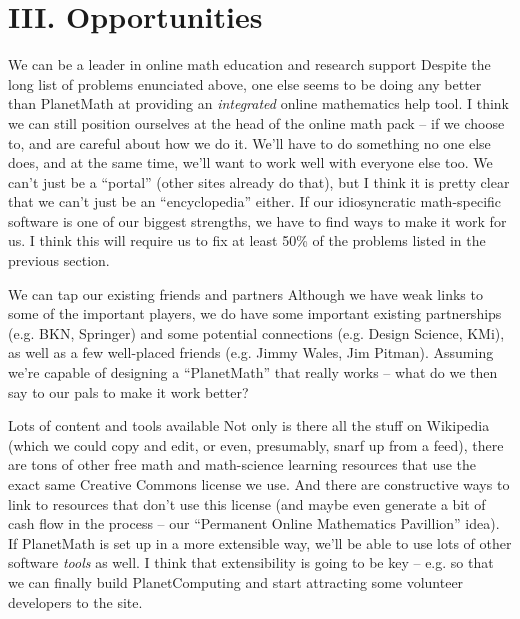 \section*{III. Opportunities}

\begin{paragraph}{We can be a leader in online math education and research support}
Despite the long list of problems enunciated above, one
else seems to be doing any better than PlanetMath at
providing an \emph{integrated} online mathematics help
tool.  I think we can still position ourselves at the head
of the online math pack -- if we choose to, and are
careful about how we do it.  We'll have to do something no
one else does, and at the same time, we'll want to work
well with everyone else too.  We can't just be a
``portal'' (other sites already do that), but I think it
is pretty clear that we can't just be an ``encyclopedia''
either.  If our idiosyncratic math-specific software is
one of our biggest strengths, we have to find ways to make
it work for us.  I think this will require us to fix at
least 50\% of the problems listed in the previous section.
\end{paragraph}

\begin{paragraph}{We can tap our existing friends and partners}
Although we have weak links to some of the important
players, we do have some important existing partnerships
(e.g. BKN, Springer) and some potential connections
(e.g. Design Science, KMi), as well as a few well-placed
friends (e.g. Jimmy Wales, Jim Pitman).  Assuming we're
capable of designing a ``PlanetMath'' that really works --
what do we then say to our pals to make it work better?
\end{paragraph}

\begin{paragraph}{Lots of content and tools available}
Not only is there all the stuff on Wikipedia (which we
could copy and edit, or even, presumably, snarf up from a
feed), there are tons of other free math and math-science
learning resources that use the exact same Creative
Commons license we use.  And there are constructive ways
to link to resources that don't use this license (and
maybe even generate a bit of cash flow in the process --
our ``Permanent Online Mathematics Pavillion'' idea).  If
PlanetMath is set up in a more extensible way, we'll be
able to use lots of other software \emph{tools} as well.
I think that extensibility is going to be key -- e.g. so
that we can finally build PlanetComputing and start
attracting some volunteer developers to the site.
\end{paragraph}

